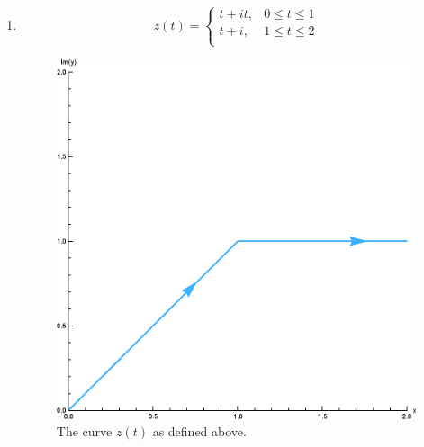 \documentclass[12pt]{book}
\begin{document}
\begin{enumerate}[label = {(\roman*)}]
    \item
        \[
            z(t) = 
                \left\{
                    \begin{array}{cc}
                        t + it, & 0 \leq t \leq 1 \\
                        t + i,  & 1 \leq t \leq 2 \\
                    \end{array}
                \right.
        \]
        \begin{figure}[H]
            \centering
            \includegraphics[scale = 0.7]{./figs/chapter_2/curve_ex_1.eps}
            \caption{The curve $z(t)$ as defined above.}
        \end{figure}


\end{enumerate}
\end{document}
